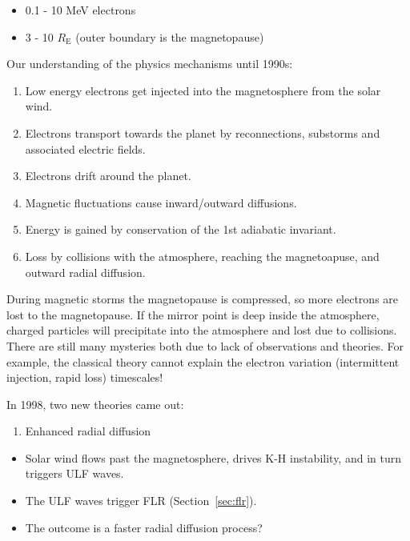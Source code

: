 \documentclass[
  notoc %
]{tufte-book}
\providecommand{\tightlist}{%
  \setlength{\itemsep}{0pt}\setlength{\parskip}{0pt}
}
\begin{document}
\begin{itemize}
\tightlist
\item
  0.1 - 10 MeV electrons
\item
  3 - 10 \(R_\text{E}\) (outer boundary is the magnetopause)
\end{itemize}

Our understanding of the physics mechanisms until 1990s:

\begin{enumerate}
\def\labelenumi{\arabic{enumi}.}
\tightlist
\item
  Low energy electrons get injected into the magnetosphere from the
  solar wind.
\item
  Electrons transport towards the planet by reconnections, substorms and
  associated electric fields.
\item
  Electrons drift around the planet.
\item
  Magnetic fluctuations cause inward/outward diffusions.
\item
  Energy is gained by conservation of the 1st adiabatic invariant.
\item
  Loss by collisions with the atmosphere, reaching the magnetoapuse, and
  outward radial diffusion.
\end{enumerate}

During magnetic storms the magnetopause is compressed, so more electrons
are lost to the magnetopause. If the mirror point is deep inside the
atmosphere, charged particles will precipitate into the atmosphere and
lost due to collisions. There are still many mysteries both due to lack
of observations and theories. For example, the classical theory cannot
explain the electron variation (intermittent injection, rapid loss)
timescales!

In 1998, two new theories came out:

\begin{enumerate}
\def\labelenumi{\arabic{enumi}.}
\tightlist
\item
  Enhanced radial diffusion
\end{enumerate}

\begin{itemize}
\tightlist
\item
  Solar wind flows past the magnetosphere, drives K-H instability, and
  in turn triggers ULF waves.
\item
  The ULF waves trigger FLR (Section~\ref{sec:flr}).
\item
  The outcome is a faster radial diffusion process?
\end{itemize}
\end{document}
